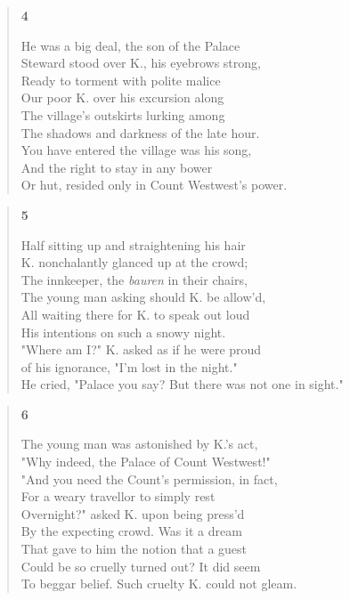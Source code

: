 \documentclass{article}
\begin{document}
\newpage
\begin{verse}
  \begin{center}
    \textbf{4} \\
  \end{center}
  He was a big deal, the son of the Palace \\
  Steward stood over K., his eyebrows strong, \\
  Ready to torment with polite malice \\
  Our poor K. over his excursion along \\
  The village's outskirts lurking among \\
  The shadows and darkness of the late hour. \\
  You have entered the village was his song, \\
  And the right to stay in any bower \\
  Or hut, resided only in Count Westwest's power.
\end{verse}
\begin{verse}
  \begin{center}
    \textbf{5} \\
  \end{center}
  Half sitting up and straightening his hair \\
  K. nonchalantly glanced up at the crowd;  \\
  The innkeeper, the \textit{bauren} in their chairs,  \\
  The young man asking should K. be allow'd, \\
  All waiting there for K. to speak out loud \\
  His intentions on such a snowy night. \\
  "Where am I?" K. asked as if he were proud \\
  of his ignorance, "I'm lost in the night." \\
  He cried, "Palace you say? But there was not one in sight."
\end{verse}
\begin{verse}
  \begin{center}
    \textbf{6} \\
  \end{center}
  The young man was astonished by K.'s act, \\
  "Why indeed, the Palace of Count Westwest!" \\
  "And you need the Count's permission, in fact, \\
  For a weary travellor to simply rest \\
  Overnight?" asked K. upon being press'd \\
  By the expecting crowd. Was it a dream \\
  That gave to him the notion that a guest \\
  Could be so cruelly turned out? It did seem \\
  To beggar belief. Such cruelty K. could not gleam.
\end{verse}
\end{document}
